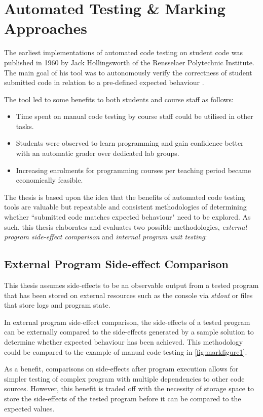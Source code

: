 \documentclass[hidelinks]{report}
\begin{document}
\section{Automated Testing \& Marking Approaches}

The earliest implementations of automated code testing on student code was published in 1960 by Jack Hollingsworth of the Rensselaer Polytechnic Institute. The main goal of his tool was to autonomously verify the correctness of student submitted code in relation to a pre-defined expected behaviour \cite{AutomatedFirst}.

The tool led to some benefits to both students and course staff as follows:
\begin{itemize}
	\item Time spent on manual code testing by course staff could be utilised in other tasks.
	\item Students were observed to learn programming and gain confidence better with an automatic grader over dedicated lab groups.
	\item Increasing enrolments for programming courses per teaching period became economically feasible.
\end{itemize}

The thesis is based upon the idea that the benefits of automated code testing tools are valuable but repeatable and consistent methodologies of determining whether ``submitted code matches expected behaviour" need to be explored. As such, this thesis elaborates and evaluates two possible methodologies, \textit{external program side-effect comparison} and \textit{internal program unit testing}:

\subsection{External Program Side-effect Comparison}

This thesis assumes side-effects to be an observable output from a tested program that has been stored on external resources such as the console via \textit{stdout} or files that store logs and program state.

In external program side-effect comparison, the side-effects of a tested program can be externally compared to the side-effects generated by a sample solution to determine whether expected behaviour has been achieved. This methodology could be compared to the example of manual code testing in \autoref{fig:markfigure1}.

As a benefit, comparisons on side-effects after program execution allows for simpler testing of complex program with multiple dependencies to other code sources. However, this benefit is traded off with the necessity of storage space to store the side-effects of the tested program before it can be compared to the expected values.
\end{document}
